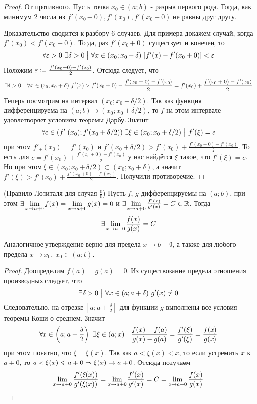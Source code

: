 \begin{proof}
	От противного. Пусть точка $x_0 \in (a; b)$ - разрыв первого рода. Тогда, как минимум 2 числа из $f'(x_0 - 0), f'(x_0), f'(x_0 + 0)$ не равны друг другу.
	
	Доказательство сводится к разбору 6 случаев. Для примера докажем случай, когда $f'(x_0) < f'(x_0 + 0)$. Тогда, раз $f'(x_0 + 0)$ существует и конечен, то
	\[
		\forall \varepsilon > 0\ \exists \delta > 0 \ \big|\  \forall x \in (x_0; x_0 + \delta)\ |f'(x) - f'(x_0 + 0)| < \varepsilon
	\]
	Положим $\varepsilon := \frac{f'(x_0 + 0) - f'(x_0)}{2}$. Отсюда следует, что
	\[
		\exists \delta > 0 \ \big|\  \forall x \in (x_0; x_0 + \delta)\ f'(x) > f'(x_0 + 0) - \frac{f'(x_0 + 0) - f'(x_0)}{2} = f'(x_0) + \frac{f'(x_0 + 0) - f'(x_0)}{2}
	\]
	Теперь посмотрим на интервал $(x_0; x_0 + \delta / 2)$. Так как функция дифференцируема на $(a; b) \supset (x_0; x_0 + \delta / 2)$, то $f$ на этом интервале удовлетворяет условиям теоремы Дарбу. Значит
	\[
		\forall c \in (f'_+(x_0); f'(x_0 + \delta / 2))\ \exists \xi \in (x_0; x_0 + \delta / 2) \such f'(\xi) = c
	\]
	при этом $f'_+(x_0) = f'(x_0)$ и  $f'(x_0 + \delta / 2) > f'(x_0) + \frac{f'(x_0 + 0) - f'(x_0)}{2}$. То есть для $c = f'(x_0) + \frac{f'(x_0 + 0) - f'(x_0)}{2}$ у нас найдётся $\xi$ такое, что $f'(\xi) = c$. Но при этом $\xi \in (x_0; x_0 + \delta / 2) \subset (x_0; x_0 + \delta)$, а значит $f'(\xi) > f'(x_0) + \frac{f'(x_0 + 0) - f'(x_0)}{2}$. Получили противоречие.
\end{proof}

\begin{theorem} (Правило Лопиталя для случая $\frac{0}{0}$)
	Пусть $f$, $g$ дифференцируемы на $(a; b)$, при этом $\exists \lim\limits_{x \to a+0} f(x) = \lim\limits_{x \to a+0} g(x) = 0$ и $\exists \lim\limits_{x \to a+0} \frac{f'(x)}{g'(x)} = C \in \bar{\mathbb{R}}$. Тогда
	\[
		\exists \lim\limits_{x \to a+0} \frac{f(x)}{g(x)} = C
	\]
\end{theorem}

\begin{note}
	Аналогичное утверждение верно для предела $x \to b-0$, а также для любого предела $x \to x_0,\ x_0 \in (a; b)$.
\end{note}

\begin{proof}
	Доопределим $f(a) = g(a) = 0$. Из существование предела отношения производных следует, что
	\[
		\exists \delta > 0 \ \big|\  \forall x \in (a; a + \delta)\ g'(x) \neq 0
	\]
	Следовательно, на отрезке $\left[a; a + \frac{\delta}{2}\right]$ для функции $g$ выполнены все условия теоремы Коши о среднем. Значит
	\[
		\forall x \in \left(a; a + \frac{\delta}{2}\right)\ \exists \xi \in (a; x) \ \big|\  \frac{f(x) - f(a)}{g(x) - g(a)} = \frac{f'(\xi)}{g'(\xi)} = \frac{f(x)}{g(x)}
	\]
	при этом понятно, что $\xi = \xi(x)$. Так как $a < \xi(x) < x$, то если устремить $x$ к $a + 0$, то $a < \xi(x) \leqslant a + 0 \Rightarrow \xi(x) \to a + 0$. Отсюда получаем
	\[
		\lim\limits_{x \to a + 0} \frac{f'(\xi(x))}{g'(\xi(x))} = \lim\limits_{x \to a + 0} \frac{f'(x)}{g'(x)} = C = \lim\limits_{x \to a + 0} \frac{f(x)}{g(x)}
	\]
\end{proof}

